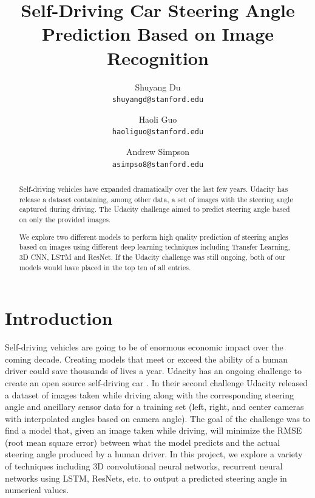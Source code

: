 \documentclass[10pt,twocolumn,letterpaper]{article}
\begin{document}
\title{Self-Driving Car Steering Angle Prediction Based on Image Recognition}

\author{Shuyang Du\\
{\tt\small shuyangd@stanford.edu}
\and
Haoli Guo\\
{\tt\small haoliguo@stanford.edu}
\and
Andrew Simpson\\
{\tt\small asimpso8@stanford.edu}
}

\maketitle

\begin{abstract}
Self-driving vehicles have expanded dramatically over the last few years. Udacity has release a dataset containing, among other data, a set of images with the steering angle captured during driving. The Udacity challenge aimed to predict steering angle based on only the provided images. 

We explore two different models to perform high quality prediction of steering angles based on images using different deep learning techniques including Transfer Learning, 3D CNN, LSTM and ResNet. If the Udacity challenge was still ongoing, both of our models would have placed in the top ten of all entries. 

\end{abstract}

\section{Introduction}
Self-driving vehicles are going to be of enormous economic impact over the coming decade. Creating models that meet or exceed the ability of a human driver could save thousands of lives a year. Udacity has an ongoing challenge to create an open source self-driving car \cite{udacity}. In their second challenge Udacity released a dataset of images taken while driving along with the corresponding steering angle and ancillary sensor data for a training set (left, right, and center cameras with interpolated angles based on camera angle). The goal of the challenge was to find a model that, given an image taken while driving, will minimize the RMSE (root mean square error) between what the model predicts and the actual steering angle produced by a human driver. In this project, we explore a variety of techniques including 3D convolutional neural networks, recurrent neural networks using LSTM, ResNets, etc. to output a predicted steering angle in numerical values.
\end{document}
